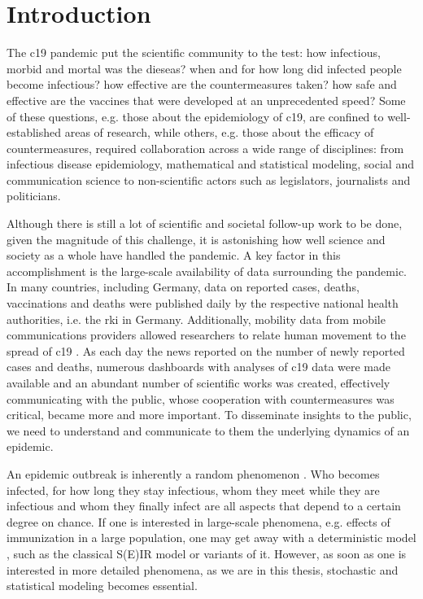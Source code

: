 \chapter{Introduction}

The \gls{c19} pandemic put the scientific community to the test: how infectious, morbid and mortal was the dieseas? when and for how long did infected people become infectious? how effective are the countermeasures taken? how safe and effective are the vaccines that were developed at an unprecedented speed? Some of these questions, e.g. those about the epidemiology of \acrshort{c19}, are confined to well-established areas of research, while others, e.g. those about the efficacy of countermeasures, required collaboration across a wide range of disciplines: from infectious disease epidemiology, mathematical and statistical modeling, social and communication science to non-scientific actors such as legislators, journalists and politicians.

Although there is still a lot of scientific and societal follow-up work to be done, given the magnitude of this challenge, it is astonishing how well science and society as a whole have handled the pandemic. A key factor in this accomplishment is the large-scale availability of data surrounding the pandemic. In many countries, including Germany, data on reported cases, deaths, vaccinations and deaths were published daily by the respective national health authorities, i.e. the \gls{rki} \citep{RobertKoch-Institut2022SARSCoV2,RobertKoch-Institut2021COVID19Hospitalisierungen} in Germany. Additionally, mobility data from mobile communications providers allowed researchers to relate human movement to the spread of \acrshort{c19} \citep{Kraemer2020Effect,Schlosser2020COVID19}. 
As each day the news reported on the number of newly reported cases and deaths, numerous dashboards with analyses of \acrshort{c19} data were made available and an abundant number of scientific works was created, effectively communicating with the public, whose cooperation with countermeasures was critical, became more and more important. To disseminate insights to the public, we need to understand and communicate to them the underlying dynamics of an epidemic.

An epidemic outbreak is inherently a random phenomenon \citep{Diekmann2013Mathematical}. Who becomes infected, for how long they stay infectious, whom they meet while they are infectious and whom they finally infect are all aspects that depend to a certain degree on chance. If one is interested in large-scale phenomena, e.g. effects of immunization in a large population, one may get away with a deterministic model \citep{Britton2019Stochastic}, such as the classical S(E)IR model \citep{Kermack1927Contribution} or variants of it. However, as soon as one is interested in more detailed phenomena, as we are in this thesis, stochastic and statistical modeling becomes essential. 

